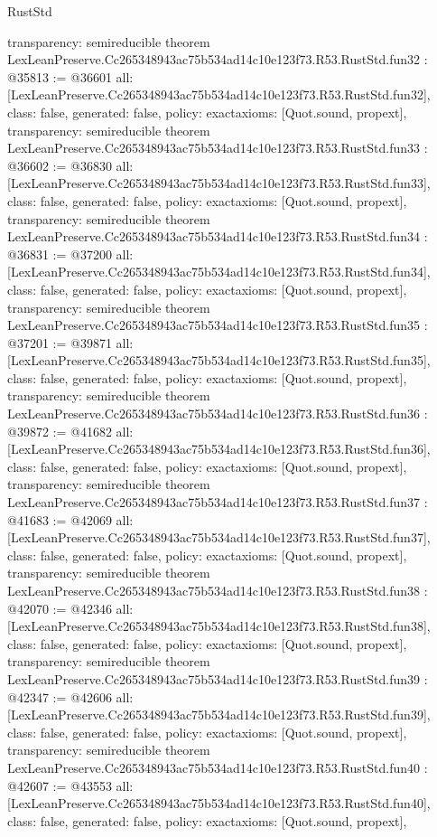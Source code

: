 \begin{lexlean}{RustStd}
\begin{coremodule}
{  transparency: semireducible
}
theorem LexLeanPreserve.Cc265348943ac75b534ad14c10e123f73.R53.RustStd.fun32 : @35813 := @36601 {
  all: [LexLeanPreserve.Cc265348943ac75b534ad14c10e123f73.R53.RustStd.fun32],
  class: false,
  generated: false,
  policy: exact{axioms: [Quot.sound, propext]},
  transparency: semireducible
}
theorem LexLeanPreserve.Cc265348943ac75b534ad14c10e123f73.R53.RustStd.fun33 : @36602 := @36830 {
  all: [LexLeanPreserve.Cc265348943ac75b534ad14c10e123f73.R53.RustStd.fun33],
  class: false,
  generated: false,
  policy: exact{axioms: [Quot.sound, propext]},
  transparency: semireducible
}
theorem LexLeanPreserve.Cc265348943ac75b534ad14c10e123f73.R53.RustStd.fun34 : @36831 := @37200 {
  all: [LexLeanPreserve.Cc265348943ac75b534ad14c10e123f73.R53.RustStd.fun34],
  class: false,
  generated: false,
  policy: exact{axioms: [Quot.sound, propext]},
  transparency: semireducible
}
theorem LexLeanPreserve.Cc265348943ac75b534ad14c10e123f73.R53.RustStd.fun35 : @37201 := @39871 {
  all: [LexLeanPreserve.Cc265348943ac75b534ad14c10e123f73.R53.RustStd.fun35],
  class: false,
  generated: false,
  policy: exact{axioms: [Quot.sound, propext]},
  transparency: semireducible
}
theorem LexLeanPreserve.Cc265348943ac75b534ad14c10e123f73.R53.RustStd.fun36 : @39872 := @41682 {
  all: [LexLeanPreserve.Cc265348943ac75b534ad14c10e123f73.R53.RustStd.fun36],
  class: false,
  generated: false,
  policy: exact{axioms: [Quot.sound, propext]},
  transparency: semireducible
}
theorem LexLeanPreserve.Cc265348943ac75b534ad14c10e123f73.R53.RustStd.fun37 : @41683 := @42069 {
  all: [LexLeanPreserve.Cc265348943ac75b534ad14c10e123f73.R53.RustStd.fun37],
  class: false,
  generated: false,
  policy: exact{axioms: [Quot.sound, propext]},
  transparency: semireducible
}
theorem LexLeanPreserve.Cc265348943ac75b534ad14c10e123f73.R53.RustStd.fun38 : @42070 := @42346 {
  all: [LexLeanPreserve.Cc265348943ac75b534ad14c10e123f73.R53.RustStd.fun38],
  class: false,
  generated: false,
  policy: exact{axioms: [Quot.sound, propext]},
  transparency: semireducible
}
theorem LexLeanPreserve.Cc265348943ac75b534ad14c10e123f73.R53.RustStd.fun39 : @42347 := @42606 {
  all: [LexLeanPreserve.Cc265348943ac75b534ad14c10e123f73.R53.RustStd.fun39],
  class: false,
  generated: false,
  policy: exact{axioms: [Quot.sound, propext]},
  transparency: semireducible
}
theorem LexLeanPreserve.Cc265348943ac75b534ad14c10e123f73.R53.RustStd.fun40 : @42607 := @43553 {
  all: [LexLeanPreserve.Cc265348943ac75b534ad14c10e123f73.R53.RustStd.fun40],
  class: false,
  generated: false,
  policy: exact{axioms: [Quot.sound, propext]},
}
\end{coremodule}
\end{lexlean}

